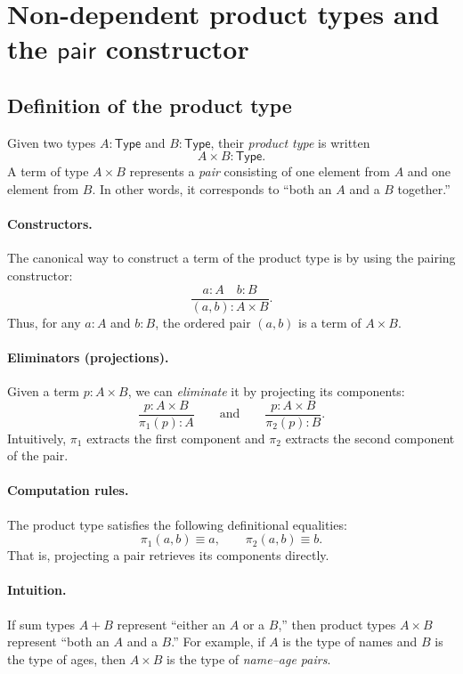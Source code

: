 \documentclass{article}
\newcommand{\Type}{\ensuremath{\mathsf{Type}}}
\newcommand{\jdeq}{\equiv}                 %
\begin{document}
\section{Non-dependent product types and the \texorpdfstring{$\mathsf{pair}$}{pair} constructor}

\subsection*{Definition of the product type}

Given two types \(A : \Type\) and \(B : \Type\), their \emph{product type} is written
\[
A \times B : \Type.
\]
A term of type \(A \times B\) represents a \emph{pair} consisting of one element from \(A\) and one element from \(B\).  
In other words, it corresponds to “both an \(A\) and a \(B\) together.”

\paragraph{Constructors.}
The canonical way to construct a term of the product type is by using the pairing constructor:
\[
\frac{a : A \quad b : B}{(a, b) : A \times B}.
\]
Thus, for any \(a : A\) and \(b : B\), the ordered pair \((a, b)\) is a term of \(A \times B\).

\paragraph{Eliminators (projections).}
Given a term \(p : A \times B\), we can \emph{eliminate} it by projecting its components:
\[
\frac{p : A \times B}{\pi_1(p) : A}
\qquad\text{and}\qquad
\frac{p : A \times B}{\pi_2(p) : B}.
\]
Intuitively, \(\pi_1\) extracts the first component and \(\pi_2\) extracts the second component of the pair.

\paragraph{Computation rules.}
The product type satisfies the following definitional equalities:
\[
\pi_1(a,b) \jdeq a, \qquad \pi_2(a,b) \jdeq b.
\]
That is, projecting a pair retrieves its components directly.

\paragraph{Intuition.}
If sum types \(A + B\) represent “either an \(A\) or a \(B\),”  
then product types \(A \times B\) represent “both an \(A\) and a \(B\).”  
For example, if \(A\) is the type of names and \(B\) is the type of ages,  
then \(A \times B\) is the type of \emph{name–age pairs}.
\end{document}
